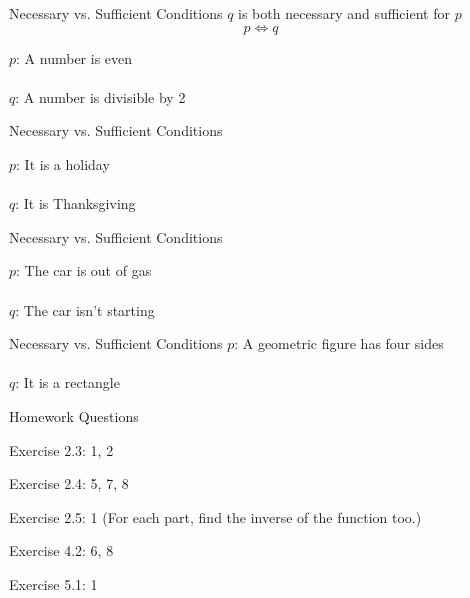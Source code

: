 \documentclass{./../../Latex/teaching_slides}
\begin{document}
\begin{frame}{Necessary vs. Sufficient Conditions}
$q$ is both necessary and sufficient for $p$
$$ p \iff q $$ 
\vspace{1em}

\pause
$p$:  A number is even \\~\\
$q$:  A number is divisible by 2
\end{frame}

\begin{frame}{Necessary vs. Sufficient Conditions}
\vspace{1em}


$p$:  It is a holiday  \\~\\
$q$:  It is Thanksgiving
\end{frame}

\begin{frame}{Necessary vs. Sufficient Conditions}
\vspace{1em}


$p$: The car is out of gas  \\~\\
$q$: The car isn't starting
\end{frame}

\begin{frame}{Necessary vs. Sufficient Conditions}
\vspace{1em}
$p$:  A geometric figure has four sides  \\~\\
$q$:  It is a rectangle
\end{frame}

\begin{frame}{Homework Questions}
\begin{witemize}
  \item Exercise 2.3: 1, 2
  \item Exercise 2.4: 5, 7, 8
  \item Exercise 2.5: 1 (For each part, find the inverse of the function too.)
  \item Exercise 4.2: 6, 8
  \item Exercise 5.1: 1
\end{witemize}
\end{frame}
\end{document}

